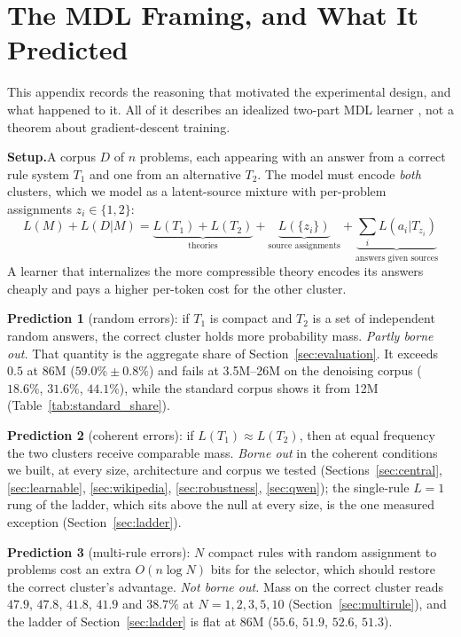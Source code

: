 \documentclass{article}
\begin{document}
\section{The MDL Framing, and What It Predicted}
\label{app:mdl}

This appendix records the reasoning that motivated the experimental design, and what happened to it. All of it describes an idealized two-part MDL learner \citep{rissanen1978modeling,grunwald2007minimum}, not a theorem about gradient-descent training.

\textbf{Setup.}\quad A corpus $D$ of $n$ problems, each appearing with an answer from a correct rule system $T_1$ and one from an alternative $T_2$. The model must encode \emph{both} clusters, which we model as a latent-source mixture with per-problem assignments $z_i \in \{1,2\}$:
\[
L(M) + L(D|M) = \underbrace{L(T_1) + L(T_2)}_{\text{theories}} + \underbrace{L(\{z_i\})}_{\text{source assignments}} + \underbrace{\sum_i L(a_i | T_{z_i})}_{\text{answers given sources}}
\]
A learner that internalizes the more compressible theory encodes its answers cheaply and pays a higher per-token cost for the other cluster.

\textbf{Prediction 1} (random errors): if $T_1$ is compact and $T_2$ is a set of independent random answers, the correct cluster holds more probability mass. \emph{Partly borne out.} That quantity is the aggregate share of Section~\ref{sec:evaluation}. It exceeds $0.5$ at 86M ($59.0\% \pm 0.8\%$) and fails at 3.5M--26M on the denoising corpus ($18.6\%$, $31.6\%$, $44.1\%$), while the standard corpus shows it from 12M (Table~\ref{tab:standard_share}).

\textbf{Prediction 2} (coherent errors): if $L(T_1) \approx L(T_2)$, then at equal frequency the two clusters receive comparable mass. \emph{Borne out} in the coherent conditions we built, at every size, architecture and corpus we tested (Sections~\ref{sec:central}, \ref{sec:learnable}, \ref{sec:wikipedia}, \ref{sec:robustness}, \ref{sec:qwen}); the single-rule $L{=}1$ rung of the ladder, which sits above the null at every size, is the one measured exception (Section~\ref{sec:ladder}).

\textbf{Prediction 3} (multi-rule errors): $N$ compact rules with random assignment to problems cost an extra $O(n \log N)$ bits for the selector, which should restore the correct cluster's advantage. \emph{Not borne out.} Mass on the correct cluster reads $47.9$, $47.8$, $41.8$, $41.9$ and $38.7\%$ at $N = 1, 2, 3, 5, 10$ (Section~\ref{sec:multirule}), and the ladder of Section~\ref{sec:ladder} is flat at 86M ($55.6$, $51.9$, $52.6$, $51.3$).
\end{document}
